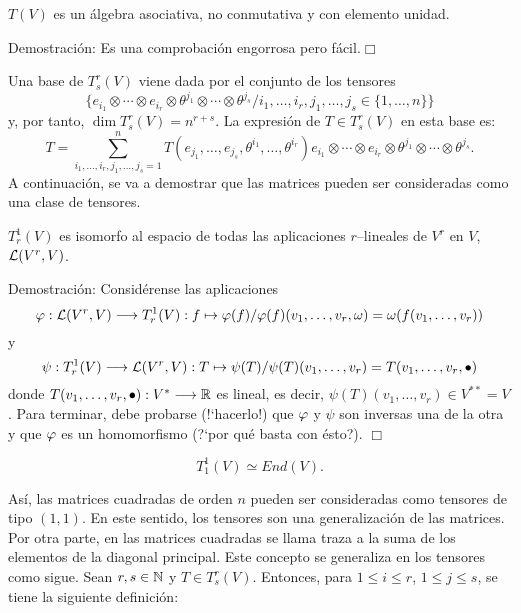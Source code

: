 \documentclass[cursovd_portada.tex]{subfiles}
\begin{document}
\begin{propoap}
$T(V)$ es un álgebra asociativa, no conmutativa y con elemento unidad.
\end{propoap}
{\sc Demostración:} Es una comprobación engorrosa pero fácil.\hfill$\Box$ \par\bigskip Una base de $T^r_s(V)$
viene dada por el conjunto de los tensores
$$\{e_{i_1}\otimes\cdots\otimes e_{i_r}\otimes\theta^{j_1}\otimes\cdots\otimes
\theta^{j_s}/i_1,\dots ,i_r,j_1,\dots ,j_s\in\{1,\dots,n\}\}$$ y, por tanto, $\dim T^r_s(V)=n^{r+s}$. La expresión
de $T\in T^r_s(V)$ en esta base es:
$$T=\sum_{i_1,\dots ,i_r,j_1,\dots ,j_s=1}^nT(e_{j_1},\dots ,e_{j_s},\theta^
{i_1},\dots ,\theta^{i_r})e_{i_1}\otimes\cdots\otimes e_{i_r}\otimes\theta^
{j_1}\otimes\cdots\otimes\theta^{j_s}.$$ \hs A continuación, se va a demostrar que las matrices pueden ser
consideradas como una clase de tensores.
\begin{propoap}
$T^1_r(V)$ es isomorfo al espacio de todas las aplicaciones $r$--li\-nea\-les de $V^r$ en $V$, ${\cal L}(V^r,V)$.
\end{propoap}
{\sc Demostración:} Considérense las aplicaciones
$$\varphi:{\cal L}(V^r,V)\longrightarrow T^1_r(V):f\mapsto\varphi(f)/\varphi(f)(v_1,\dots ,
v_r,\omega)=\omega(f(v_1,\dots ,v_r))$$ y
$$\psi:T^1_r(V)\longrightarrow{\cal L}(V^r,V):T\mapsto\psi(T)/\psi(T)(v_1,\dots ,
v_r)=T(v_1,\dots ,v_r,\bullet)$$ donde $T(v_1,\dots ,v_r,\bullet):V^*\longrightarrow\mathbb{R}$ es lineal, es decir, $\psi(T)(v_1,
\dots ,v_r)\in V^{**}=V$. Para terminar, debe probarse (!`hacerlo!) que $\varphi$ y $\psi$ son inversas una de la otra
y que $\varphi$ es un homomorfismo (?`por qué basta con ésto?). \hfill$ \Box$
\begin{coroap}
$$T^1_1(V)\simeq End(V).$$
\end{coroap}
\par\bigskip
Así, las matrices cuadradas de orden $n$ pueden ser consideradas como tensores de tipo $(1,1)$. En este sentido,
los tensores son una generalización de las matrices. Por otra parte, en las matrices cuadradas se llama traza a la
suma de los elementos de la diagonal principal. Este concepto se generaliza en los tensores como sigue. Sean
$r,s\in\mathbb{N}$ y $T\in T^r_s(V)$. Entonces, para $1\leq i\leq r$, $1\leq j\leq s$, se tiene la siguiente definición:

\newpage
\end{document}
